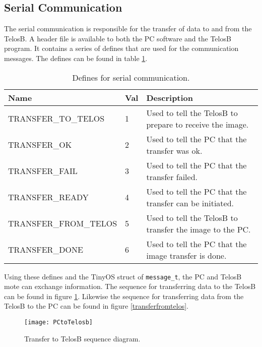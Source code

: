 \subsection{Serial Communication}
\label{sec:Serial-Communication}
The serial communication is responsible for the transfer of data to and from the TelosB. A header file is available to both the PC software and the TelosB program. It contains a series of defines that are used for the communication messages. The defines can be found in table \ref{definetable}.
\begin{table}[H]
\centering
    \begin{tabular}{lll}
    \hline
    Name                  & Val & Description                                               \\ \hline
    \rowcolor{gr}
    TRANSFER\_TO\_TELOS   & 1     & Used to tell the TelosB to prepare to receive the image. \\ %
    TRANSFER\_OK          & 2     & Used to tell the PC that the transfer was ok.             \\ %
    \rowcolor{gr}
    TRANSFER\_FAIL        & 3     & Used to tell the PC that the transfer failed.             \\ %
    TRANSFER\_READY       & 4     & Used to tell the PC that the transfer can be initiated.   \\ %
    \rowcolor{gr}
    TRANSFER\_FROM\_TELOS & 5     & Used to tell the TelosB to transfer the image to the PC.  \\ %
    TRANSFER\_DONE        & 6     & Used to tell the PC that the image transfer is done.      \\ \hline
    \end{tabular}
    \caption{Defines for serial communication.}
    \label{definetable}
\end{table}

Using these defines and the TinyOS struct of \texttt{message\_t}, the PC and TelosB mote can exchange information. 
The sequence for transferring data to the TelosB can be found in figure \ref{transfertotelos}. 
Likewise the sequence for transferring data from the TelosB to the PC can be found in figure \ref{transferfromtelos}.

\begin{figure}[H]
	\centering
	\texttt{[image: PCtoTelosb]}
	\caption{Transfer to TelosB sequence diagram.}
	\label{transfertotelos}
\end{figure}

